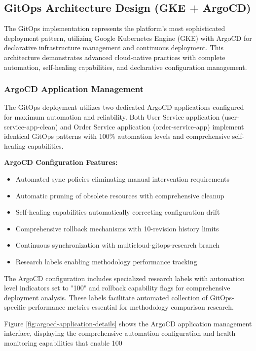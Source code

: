 \subsection{GitOps Architecture Design (GKE + ArgoCD)}

The GitOps implementation represents the platform's most sophisticated deployment pattern, utilizing Google Kubernetes Engine (GKE) with ArgoCD for declarative infrastructure management and continuous deployment. This architecture demonstrates advanced cloud-native practices with complete automation, self-healing capabilities, and declarative configuration management.

\subsubsection{ArgoCD Application Management}

The GitOps deployment utilizes two dedicated ArgoCD applications configured for maximum automation and reliability. Both User Service application (user-service-app-clean) and Order Service application (order-service-app) implement identical GitOps patterns with 100\% automation levels and comprehensive self-healing capabilities.

\textbf{ArgoCD Configuration Features:}
\begin{itemize}
\item Automated sync policies eliminating manual intervention requirements
\item Automatic pruning of obsolete resources with comprehensive cleanup
\item Self-healing capabilities automatically correcting configuration drift
\item Comprehensive rollback mechanisms with 10-revision history limits
\item Continuous synchronization with multicloud-gitops-research branch
\item Research labels enabling methodology performance tracking
\end{itemize}

The ArgoCD configuration includes specialized research labels with automation level indicators set to "100" and rollback capability flags for comprehensive deployment analysis. These labels facilitate automated collection of GitOps-specific performance metrics essential for methodology comparison research.

Figure \ref{fig:argocd-application-details} shows the ArgoCD application management interface, displaying the comprehensive automation configuration and health monitoring capabilities that enable 100%

